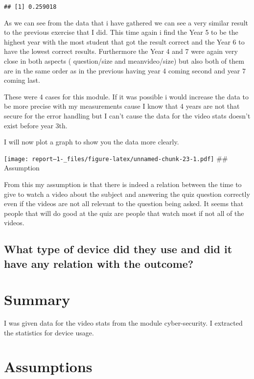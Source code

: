 \documentclass[
]{article}
\begin{document}
\begin{verbatim}
## [1] 0.259018
\end{verbatim}

As we can see from the data that i have gathered we can see a very
similar result to the previous exercise that I did. This time again i
find the Year 5 to be the highest year with the most student that got
the result correct and the Year 6 to have the lowest correct results.
Furthermore the Year 4 and 7 were again very close in both aspects (
question/size and meanvideo/size) but also both of them are in the same
order as in the previous having year 4 coming second and year 7 coming
last.

These were 4 cases for this module. If it was possible i would increase
the data to be more precise with my measurements cause I know that 4
years are not that secure for the error handling but I can't cause the
data for the video stats doesn't exist before year 3th.

I will now plot a graph to show you the data more clearly.

\texttt{[image: report--1-\_files/figure-latex/unnamed-chunk-23-1.pdf]}
\#\# Assumption

From this my assumption is that there is indeed a relation between the
time to give to watch a video about the subject and answering the quiz
question correctly even if the videos are not all relevant to the
question being asked. It seems that people that will do good at the quiz
are people that watch most if not all of the videos.

\hypertarget{what-type-of-device-did-they-use-and-did-it-have-any-relation-with-the-outcome}{%
\subsection{What type of device did they use and did it have any
relation with the
outcome?}\label{what-type-of-device-did-they-use-and-did-it-have-any-relation-with-the-outcome}}

\hypertarget{summary}{%
\section{Summary}\label{summary}}

I was given data for the video stats from the module cyber-security. I
extracted the statistics for device usage.

\hypertarget{assumptions}{%
\section{Assumptions}\label{assumptions}}
\end{document}
